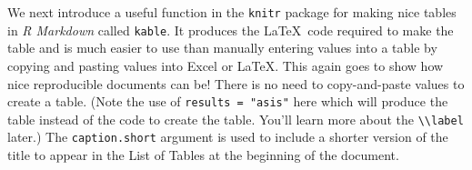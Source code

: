 \documentclass[12pt,twoside]{reedthesis}
\begin{document}
  We next introduce a useful function in the \texttt{knitr} package for
  making nice tables in \emph{R Markdown} called \texttt{kable}. It
  produces the \LaTeX~code required to make the table and is much easier
  to use than manually entering values into a table by copying and pasting
  values into Excel or \LaTeX. This again goes to show how nice
  reproducible documents can be! There is no need to copy-and-paste values
  to create a table. (Note the use of \texttt{results\ =\ "asis"} here
  which will produce the table instead of the code to create the table.
  You'll learn more about the
  \texttt{\textbackslash{}\textbackslash{}label} later.) The
  \texttt{caption.short} argument is used to include a shorter version of
  the title to appear in the List of Tables at the beginning of the
  document.
  
  \begin{Shaded}
  \begin{Highlighting}[]
   \NormalTok{(}\NormalTok{, }\NormalTok{),}
         \CharTok{\textbackslash{}\textbackslash{}}\NormalTok{,}
         \NormalTok{)}
  \end{Highlighting}
  \end{Shaded}
  
\end{document}
